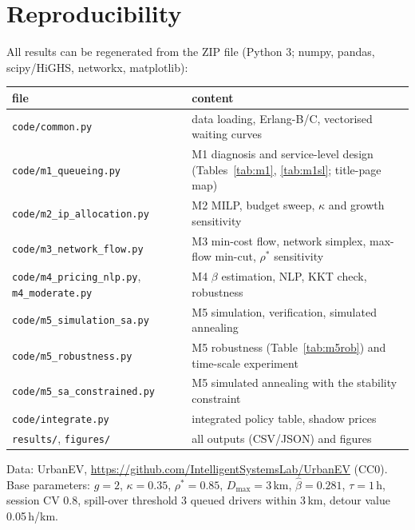 \documentclass[11pt,a4paper]{article}
\begin{document}
\appendix
\section{Reproducibility}
All results can be regenerated from the ZIP file (Python 3; numpy, pandas, scipy/HiGHS, networkx, matplotlib):
\begin{center}\small
\begin{tabular}{@{}L{5.9cm}L{9.9cm}@{}}\toprule
file & content\\\midrule
\texttt{code/common.py} & data loading, Erlang-B/C, vectorised waiting curves\\
\texttt{code/m1\_queueing.py} & M1 diagnosis and service-level design (Tables~\ref{tab:m1}, \ref{tab:m1sl}; title-page map)\\
\texttt{code/m2\_ip\_allocation.py} & M2 MILP, budget sweep, $\kappa$ and growth sensitivity\\
\texttt{code/m3\_network\_flow.py} & M3 min-cost flow, network simplex, max-flow min-cut, $\rho^*$ sensitivity\\
\texttt{code/m4\_pricing\_nlp.py}, \texttt{m4\_moderate.py} & M4 $\beta$ estimation, NLP, KKT check, robustness\\
\texttt{code/m5\_simulation\_sa.py} & M5 simulation, verification, simulated annealing\\
\texttt{code/m5\_robustness.py} & M5 robustness (Table~\ref{tab:m5rob}) and time-scale experiment\\
\texttt{code/m5\_sa\_constrained.py} & M5 simulated annealing with the stability constraint\\
\texttt{code/integrate.py} & integrated policy table, shadow prices\\
\texttt{results/}, \texttt{figures/} & all outputs (CSV/JSON) and figures\\\bottomrule
\end{tabular}\end{center}
Data: UrbanEV, \url{https://github.com/IntelligentSystemsLab/UrbanEV} (CC0). Base parameters: $g=2$, $\kappa=0.35$, $\rho^*=0.85$, $D_{\max}=3$\,km, $\hat\beta=0.281$, $\tau=1$\,h, session CV 0.8, spill-over threshold 3 queued drivers within 3\,km, detour value 0.05\,h/km.
\end{document}
